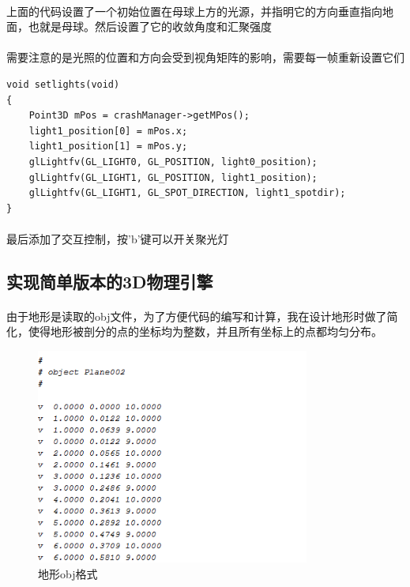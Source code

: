 \documentclass{article}
\begin{document}
            \paragraph{}
                上面的代码设置了一个初始位置在母球上方的光源，并指明它的方向垂直指向地面，也就是母球。然后设置了它的收敛角度和汇聚强度
            \paragraph{}
                需要注意的是光照的位置和方向会受到视角矩阵的影响，需要每一帧重新设置它们
            \begin{lstlisting}[language={[ANSI]C}]
void setlights(void)
{
	Point3D mPos = crashManager->getMPos();
	light1_position[0] = mPos.x;
	light1_position[1] = mPos.y;
	glLightfv(GL_LIGHT0, GL_POSITION, light0_position);
	glLightfv(GL_LIGHT1, GL_POSITION, light1_position);
	glLightfv(GL_LIGHT1, GL_SPOT_DIRECTION, light1_spotdir);
}
            \end{lstlisting}
            \paragraph{}
                最后添加了交互控制，按'b'键可以开关聚光灯
        \subsection{实现简单版本的3D物理引擎}
            \paragraph{}
                由于地形是读取的obj文件，为了方便代码的编写和计算，我在设计地形时做了简化，使得地形被剖分的点的坐标均为整数，并且所有坐标上的点都均匀分布。
                \begin{figure}[bhtp]
                    \begin{minipage}[bhtp!]{1\linewidth}\centering
                    \includegraphics[width=9cm]{v.png}
                    \caption{地形obj格式}\label{1-a}
                    \end{minipage}
                \end{figure}
\end{document}
